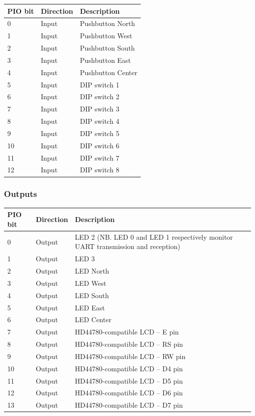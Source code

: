 \documentclass[a4paper,11pt]{article}
\begin{document}
\begin{tabular}{|l|l|p{10cm}|}
\hline
\bf{PIO bit} & \bf{Direction} & \bf{Description} \\
\hline
0 & Input & Pushbutton North \\
\hline
1 & Input & Pushbutton West \\
\hline
2 & Input & Pushbutton South \\
\hline
3 & Input & Pushbutton East \\
\hline
4 & Input & Pushbutton Center \\
\hline
5 & Input & DIP switch 1 \\
\hline
6 & Input & DIP switch 2 \\
\hline
7 & Input & DIP switch 3 \\
\hline
8 & Input & DIP switch 4 \\
\hline
9 & Input & DIP switch 5 \\
\hline
10 & Input & DIP switch 6 \\
\hline
11 & Input & DIP switch 7 \\
\hline
12 & Input & DIP switch 8 \\
\hline
\end{tabular}

\subsubsection{Outputs}

\begin{tabular}{|l|l|p{10cm}|}
\hline
\bf{PIO bit} & \bf{Direction} & \bf{Description} \\
\hline
0 & Output & LED 2 (NB. LED 0 and LED 1 respectively monitor UART transmission and reception) \\
\hline
1 & Output & LED 3 \\
\hline
2 & Output & LED North \\
\hline
3 & Output & LED West \\
\hline
4 & Output & LED South \\
\hline
5 & Output & LED East \\
\hline
6 & Output & LED Center \\
\hline
7 & Output & HD44780-compatible LCD -- E pin \\
\hline
8 & Output & HD44780-compatible LCD -- RS pin \\
\hline
9 & Output & HD44780-compatible LCD -- RW pin \\
\hline
10 & Output & HD44780-compatible LCD -- D4 pin \\
\hline
11 & Output & HD44780-compatible LCD -- D5 pin \\
\hline
12 & Output & HD44780-compatible LCD -- D6 pin \\
\hline
13 & Output & HD44780-compatible LCD -- D7 pin \\
\hline
\end{tabular}
\end{document}
